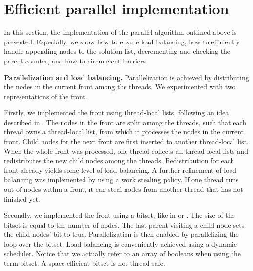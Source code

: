 \documentclass[letterpaper]{article}
\newcommand{\mypar}[1]{{\bf #1.}}
\begin{document}
\begin{invisible}
 
\end{invisible}

\section{Efficient parallel implementation}\label{sec:yourmethod}

In this section, the implementation of the parallel algorithm outlined above is presented.
Especially, we show how to ensure load balancing, how to efficiently handle appending nodes to the solution list, decrementing and checking the parent counter, and how to circumvent barriers.

\mypar{Parallelization and load balancing}
Parallelization is achieved by distributing the nodes in the current front among the threads. We experimented with two representations of the front.

Firstly, we implemented the front using thread-local lists, following an idea described in \cite{bulucc2011parallel}.
The nodes in the front are split among the threads, such that each thread owns a thread-local list, from which it processes the nodes in the current front.
Child nodes for the next front are first inserted to another thread-local list.
When the whole front was processed, one thread collects all thread-local lists and redistributes the new child nodes among the threads.
Redistribution for each front already yields some level of load balancing.
A further refinement of load balancing was implemented by using a work stealing policy.
If one thread runs out of nodes within a front, it can steal nodes from another thread that has not finished yet.

Secondly, we implemented the front using a bitset, like in \cite{agarwal2010scalable} or \cite{beamer2013direction}. The size of the bitset is equal to the number of nodes.
The last parent visiting a child node sets the child nodes' bit to true. Parallelization is then enabled by parallelizing the loop over the bitset.
Load balancing is conveniently achieved using a dynamic scheduler.
Notice that we actually refer to an array of booleans when using the term bitset. A space-efficient bitset is not thread-safe.
\end{document}
